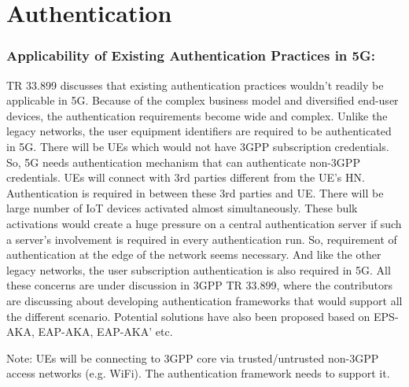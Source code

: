 \documentclass[lnicst,sechang,a4paper]{svmultln}
\begin{document}
\section{Authentication}
\label{sec:authentication}

\subsubsection{Applicability of Existing Authentication Practices in 5G:}
TR 33.899 discusses that existing authentication practices wouldn't readily be applicable in 5G. Because of the complex business model and diversified end-user devices, the authentication requirements become wide and complex. Unlike the legacy networks, the user equipment identifiers are required to be authenticated in 5G. There will be UEs which would not have 3GPP subscription credentials. So, 5G needs authentication mechanism that can authenticate non-3GPP credentials. UEs will connect with 3rd parties different from the UE's HN. Authentication is required in between these 3rd parties and UE. There will be large number of IoT devices activated almost simultaneously. These bulk activations would create a huge pressure on a central authentication server if such a server's involvement is required in every authentication run. So, requirement of authentication at the edge of the network seems necessary. And like the other legacy networks, the user subscription authentication is also required in 5G. All these concerns are under discussion in 3GPP TR 33.899, where the contributors are discussing about developing authentication frameworks that would support all the different scenario. Potential solutions have also been proposed based on EPS-AKA, EAP-AKA, EAP-AKA' etc.

Note: UEs will be connecting to 3GPP core via trusted/untrusted non-3GPP access networks (e.g. WiFi). The authentication framework needs to support it.
\end{document}
